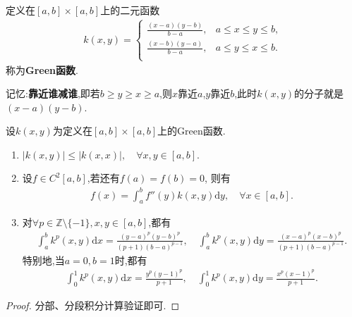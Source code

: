 \documentclass[../../main.tex]{subfiles}%
\begin{document}
\begin{definition}[Green函数]\label{definition:Green函数}
定义在$[a,b]\times [a,b]$上的二元函数
\begin{align*}
k(x,y)=\begin{cases}
\frac{\left( x-a \right) \left( y-b \right)}{b-a},&		a\leqslant x\leqslant y\leqslant b,\\
\frac{\left( x-b \right) \left( y-a \right)}{b-a},&		a\leqslant y\leqslant x\leqslant b.\\
\end{cases}
\end{align*}
称为\textbf{Green函数}.
\end{definition}
\begin{remark}
记忆:\textbf{靠近谁减谁},即若$b\geqslant y\geqslant x\geqslant a$,则$x$靠近$a$,$y$靠近$b$,此时$k(x,y)$的分子就是$(x-a)(y-b)$.
\end{remark}

\begin{theorem}[Green函数的性质]\label{theorem:Green函数的性质}
设$k(x,y)$为定义在$[a,b]\times [a,b]$上的Green函数.
\begin{enumerate}[(1)]
\item $|k(x,y)|\leqslant |k(x,x)|,\quad \forall x,y\in [a,b].$

\item 设$f\in C^2[a,b]$,若还有$f(a) = f(b) = 0$, 则有
\begin{align*}
f(x) = \int_{a}^{b} f''(y) k(x,y) \mathrm{d}y,\quad \forall x\in [a,b].
\end{align*}

\item 对$\forall p\in \mathbb{Z}\setminus \{-1\},x,y\in [a,b]$,都有
\begin{gather*}
\int_a^b{k^p\left( x,y \right) \mathrm{d}x}=\frac{\left( y-a \right) ^p\left( y-b \right) ^p}{\left( p+1 \right) \left( b-a \right) ^{p-1}},\quad \int_a^b{k^p\left( x,y \right) \mathrm{d}y}=\frac{\left( x-a \right) ^p\left( x-b \right) ^p}{\left( p+1 \right) \left( b-a \right) ^{p-1}}.
\end{gather*}
特别地,当$a=0,b=1$时,都有
\begin{gather*}
\int_0^1{k^p\left( x,y \right) \mathrm{d}x}=\frac{y^p\left( y-1 \right) ^p}{p+1},
\quad 
\int_0^1{k^p\left( x,y \right) \mathrm{d}y}=\frac{x^p\left( x-1 \right) ^p}{p+1}.
\end{gather*}
\end{enumerate}
\end{theorem}
\begin{proof}
分部、分段积分计算验证即可.
\end{proof}
\end{document}
